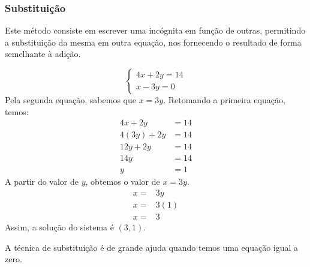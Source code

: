 \subsubsection{Substituição}
Este método consiste em escrever uma incógnita em função de outras, permitindo a substituição da mesma em outra equação, nos fornecendo o resultado de forma semelhante à adição.
\begin{exemplo}
\[\begin{cases}
4x+2y=14 \\
x-3y=0
\end{cases}\]
Pela segunda equação, sabemos que $x=3y$. Retomando a primeira equação, temos:
\begin{align*}
4x+2y&=14 \\
4(3y)+2y&=14 \\
12y+2y&=14 \\
14y&=14 \\
y&=1
\end{align*}
A partir do valor de $y$, obtemos o valor de $x=3y$.
\begin{align*}
x=&3y\\
x=&3(1)\\
x=&3
\end{align*}
Assim, a solução do sistema é $(3,1)$.
\end{exemplo}
A técnica de substituição é de grande ajuda quando temos uma equação igual a zero.


